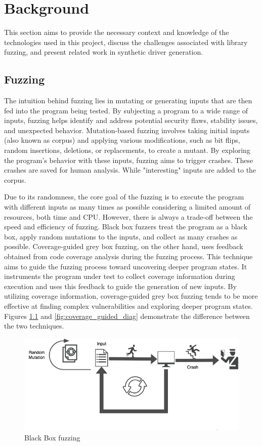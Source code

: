 \documentclass[a4paper,11pt,oneside]{report}
\begin{document}
\chapter{Background}
This section aims to provide the necessary context and knowledge
of the technologies used in this project, discuss the challenges associated with 
library fuzzing, and present related work in synthetic driver generation.


\section{Fuzzing}
The intuition behind fuzzing lies in mutating or generating 
inputs that are then fed into the program being tested. 
By subjecting a program to a wide range of inputs, fuzzing helps 
identify and address potential security flaws, stability issues, and unexpected behavior.
Mutation-based fuzzing involves taking initial inputs (also known as corpus) 
and applying various modifications, such as bit flips, random insertions, deletions, or replacements, 
to create a mutant. By exploring the program's behavior with 
these inputs, fuzzing aims to trigger crashes. These crashes are saved for human analysis.
While "interesting" inputs are added to the corpus.

Due to its randomness, the core goal of the fuzzing is to execute 
the program with different inputs as many times as possible considering 
a limited amount of resources, both time and CPU. However, there is always 
a trade-off between the speed and efficiency of fuzzing. 
Black box fuzzers treat the program as a black box, apply random mutations to the inputs, 
and collect as many crashes as possible. Coverage-guided grey box 
fuzzing, on the other hand, uses feedback obtained from code 
coverage analysis during the fuzzing process. This technique aims 
to guide the fuzzing process toward uncovering deeper program states. 
It instruments the program under test to collect coverage information 
during execution and uses this feedback to guide the generation of new inputs. 
By utilizing coverage information, coverage-guided grey box fuzzing tends 
to be more effective at finding complex vulnerabilities and exploring deeper
program states. Figures \ref{fig:blackbox_diag} and \ref{fig:coverage_guided_diag}
demonstrate the difference between the two techniques. 


\begin{figure}[ht]
	\centering
	\includegraphics[width=12cm]{figures/black_box.png}
	\caption{Black Box fuzzing}
	\label{fig:blackbox_diag}
\end{figure}
\end{document}
